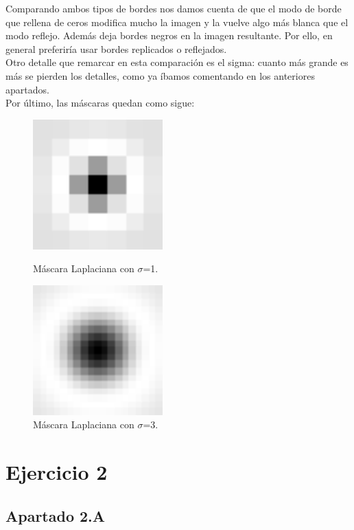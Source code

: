 \documentclass[12pt]{article}
\begin{document}
Comparando ambos tipos de bordes nos damos cuenta de que el modo de borde que rellena de ceros modifica mucho la imagen y la vuelve algo más blanca que el modo reflejo. Además deja bordes negros en la imagen resultante. Por ello, en general preferiría usar bordes replicados o reflejados.\\
Otro detalle que remarcar en esta comparación es el sigma: cuanto más grande es más se pierden los detalles, como ya íbamos comentando en los anteriores apartados.\\
Por último, las máscaras quedan como sigue:
\begin{figure}[H]
\centering
\parbox{5cm}{
\includegraphics[width=5cm]{images/LapMask1.png}
\caption{Máscara Laplaciana con $\sigma$=1.}
\label{fig:2figsA}}
\qquad
\begin{minipage}{5cm}
\includegraphics[width=5cm]{images/LapMask3.png}
\caption{Máscara Laplaciana con $\sigma$=3.}
\label{fig:2figsB}
\end{minipage}
\end{figure}

\section*{Ejercicio 2}

\subsection*{Apartado 2.A}
\end{document}
